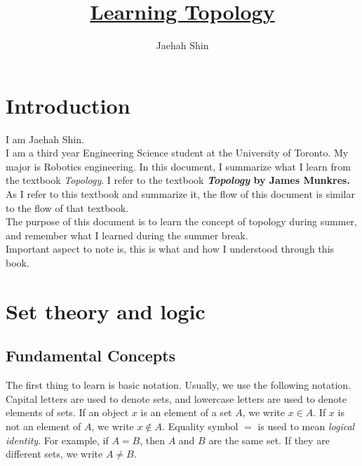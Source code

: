 \documentclass{article}
\title{\underline{\textbf{Learning Topology}}}
\author{Jaehah Shin}
\begin{document}
\maketitle
\tableofcontents

\section{Introduction}
I am Jaehah Shin. \\
I am a third year Engineering Science student at the University of Toronto. My major is Robotics engineering. In this document, I summarize what I learn from the textbook \textit{Topology}. I refer to the textbook \textbf{\textit{Topology } by James Munkres.} As I refer to this textbook and summarize it, the flow of this document is similar to the flow of that textbook. \\
The purpose of this document is to learn the concept of topology during summer, and remember what I learned during the summer break. \\
Important aspect to note is, this is what and how I understood through this book. 

\section{Set theory and logic}
\subsection{Fundamental Concepts}
The first thing to learn is basic notation. Usually, we use the following notation.
Capital letters are used to denote sets, and lowercase letters are used to denote elements of sets.
If an object $x$ is an element of a set $A$, we write $x \in A$. If $x$ is not an element of $A$, we write $x \notin A$.
Equality symbol $=$ is used to mean \textit{logical identity}. For example, if $A = B$, then $A$ and $B$ are the same set.
If they are different sets, we write $A \neq B$.
\end{document}
